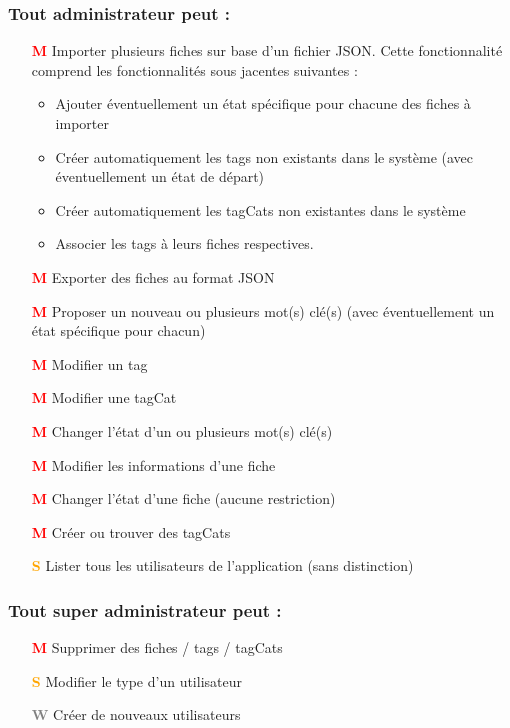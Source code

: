 \subsubsection*{Tout administrateur peut : }
\begin{itemize}
    \item[\textcolor{red}{\textbf{M}}] Importer plusieurs \glspl{fiche} sur base d'un fichier JSON.
        Cette fonctionnalité comprend les fonctionnalités sous jacentes suivantes :
        \begin{itemize}
            \item Ajouter éventuellement un état spécifique pour chacune des \glspl{fiche} à importer
            \item Créer automatiquement les \glspl{tag} non existants dans le système (avec éventuellement un état de départ)
            \item Créer automatiquement les \glspl{tagCat} non existantes dans le système
            \item Associer les \glspl{tag} à leurs \glspl{fiche} respectives. 
        \end{itemize}
    \item[\textcolor{red}{\textbf{M}}] Exporter des \glspl{fiche} au format JSON
    \item[\textcolor{red}{\textbf{M}}] Proposer un nouveau ou plusieurs mot(s) clé(s) (avec éventuellement un état spécifique pour chacun)
    \item[\textcolor{red}{\textbf{M}}] Modifier un \gls{tag} 
    \item[\textcolor{red}{\textbf{M}}] Modifier une \gls{tagCat} 
    \item[\textcolor{red}{\textbf{M}}] Changer l'état d'un ou plusieurs mot(s) clé(s)
    \item[\textcolor{red}{\textbf{M}}] Modifier les informations d'une \gls{fiche} 
    \item[\textcolor{red}{\textbf{M}}] Changer l'état d'une \gls{fiche} (aucune restriction)
    \item[\textcolor{red}{\textbf{M}}] Créer ou trouver des \glspl{tagCat}
    \item[\textcolor{orange}{\textbf{S}}] Lister tous les utilisateurs de l'application (sans distinction)
\end{itemize}

\subsubsection*{Tout super administrateur peut : }
\begin{itemize}
    \item[\textcolor{red}{\textbf{M}}] Supprimer des \glspl{fiche} / \glspl{tag} / \glspl{tagCat}
    \item[\textcolor{orange}{\textbf{S}}] Modifier le type d'un utilisateur
    \item[\textcolor{gray}{\textbf{W}}] Créer de nouveaux utilisateurs
\end{itemize}
\pagebreak

